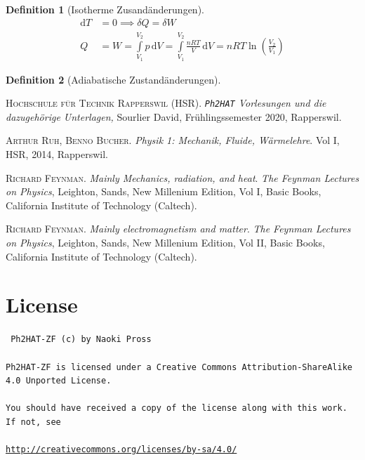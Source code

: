 \documentclass[a4paper, twocolumn]{article}
\numberwithin{equation}{section}
\theoremstyle{hsr-def}
\newtheorem{definition}{Definition}[section]
\theoremstyle{hsr-sub}
\newcommand{\dd}[1]{\ensuremath{\mathrm{d}#1}}
\newcommand{\di}[1]{\,\dd{#1}}
\begin{document}
\begin{definition}[Isotherme Zusand\"anderungen]
\begin{align*}
    \dd{T} &= 0 \implies \delta Q = \delta W \\
    Q &= W = \int\limits_{V_1}^{V_2} p \di{V}
    = \int\limits_{V_1}^{V_2} \frac{nRT}{V} \di{V}
    = nRT\ln\left(\frac{V_2}{V_1}\right)
\end{align*}
\end{definition}

\begin{definition}[Adiabatische Zustand\"anderungen]
\end{definition}

\begin{thebibliography}{2}
    \textsc{Hochschule f\"ur Technik Rapperswil (HSR)}.
    \textit{\texttt{Ph2HAT} Vorlesungen und die dazugeh\"orige Unterlagen,}
    Sourlier David,
    Fr\"uhlingssemester 2020,
    Rapperswil.

    \textsc{Arthur Ruh, Benno Bucher}.
    \textit{Physik 1: Mechanik, Fluide, W\"armelehre}.
    Vol I, HSR, 2014, Rapperswil.

    \textsc{Richard Feynman}.
    \textit{Mainly Mechanics, radiation, and heat}.
    \textit{The Feynman Lectures on Physics},
    Leighton, Sands,
    New Millenium Edition,
    Vol I,
    Basic Books,
    California Institute of Technology (Caltech).

    \textsc{Richard Feynman}.
    \textit{Mainly electromagnetism and matter}.
    \textit{The Feynman Lectures on Physics},
    Leighton, Sands,
    New Millenium Edition,
    Vol II,
    Basic Books,
    California Institute of Technology (Caltech).

\end{thebibliography}


\section*{License}
{ \tt
Ph2HAT-ZF (c) by Naoki Pross
\\\\
Ph2HAT-ZF is licensed under a Creative Commons Attribution-ShareAlike 4.0 Unported License.
\\\\
You should have received a copy of the license along with this work. If not, see 
\\\\
{\small\url{http://creativecommons.org/licenses/by-sa/4.0/}}
}
\end{document}
